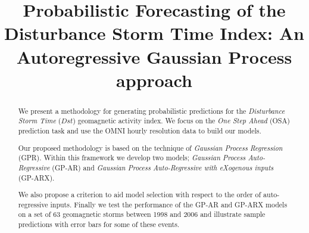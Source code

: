 \documentclass[sw, draft]{AGUTeX}
\begin{document}
%
%


\title{Probabilistic Forecasting of the Disturbance Storm Time Index: An Autoregressive Gaussian Process approach}





\begin{abstract}
We present a methodology for generating probabilistic predictions for the \emph{Disturbance Storm Time} ($Dst$) geomagnetic activity index. We focus on the \emph{One Step Ahead} (OSA) prediction task and use the OMNI hourly resolution data to build our models.

Our proposed methodology is based on the technique of \emph{Gaussian Process Regression} (GPR). Within this framework we develop two models; \emph{Gaussian Process Auto-Regressive} (GP-AR) and \emph{Gaussian Process Auto-Regressive with eXogenous inputs} (GP-ARX). 

We also propose a criterion to aid model selection with respect to the order of auto-regressive inputs. Finally we test the performance of the GP-AR and GP-ARX models on a set of 63 geomagnetic storms between 1998 and 2006 and illustrate sample predictions with error bars for some of these events.

\end{abstract}

%
%

%
\end{document}
